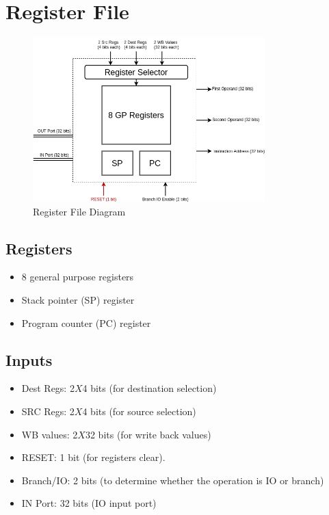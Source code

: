 \documentclass[12pt]{report}
\begin{document}
\section{Register File}
\begin{center}
    \begin{figure}[hp]
        \centering
        \includegraphics[width=0.8\textwidth]{reg_file}
        \caption{Register File Diagram}
        \label{fig:reg_file}
    \end{figure}
\end{center}

\subsection{Registers}
\begin{itemize}
    \item 8 general purpose registers
    \item Stack pointer (SP) register
    \item Program counter (PC) register
\end{itemize}

\subsection{Inputs}
\begin{itemize}
    \item Dest Regs: 2$X$4 bits (for destination selection)
    \item SRC Regs: 2$X$4 bits (for source selection)
    \item WB values: 2$X$32 bits (for write back values)
    \item RESET: 1 bit (for registers clear).
    \item Branch/IO: 2 bits (to determine whether the operation is IO or branch)
    \item IN Port: 32 bits (IO input port)
\end{itemize}
\end{document}
